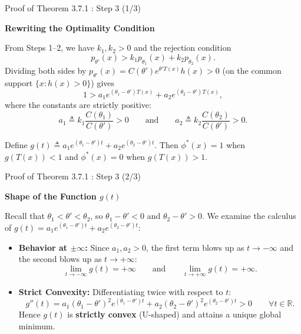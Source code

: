 \documentclass[10pt, aspectratio=169, xcolor=dvipsnames]{beamer}
\newcommand{\lead}[1]{{\color{UniBlue}\bfseries #1}}
\begin{document}
\begin{frame}{Proof of Theorem 3.7.1 : Step 3 (1/3)}
    
    \lead{Rewriting the Optimality Condition}\\
    \vspace{0.2cm}
    
    \color{Slate}
    From Steps 1--2, we have $k_1, k_2 > 0$ and the rejection condition
    \[
        p_{\theta'}(x) > k_1 p_{\theta_1}(x) + k_2 p_{\theta_2}(x).
    \]
    Dividing both sides by $p_{\theta'}(x) = C(\theta') e^{\theta' T(x)} h(x) > 0$ (on the common support $\{x : h(x) > 0\}$) gives
    \[
        1 > a_1 e^{(\theta_1 - \theta') T(x)} + a_2 e^{(\theta_2 - \theta') T(x)},
    \]
    where the constants are strictly positive:
    \[
        a_1 \triangleq k_1 \frac{C(\theta_1)}{C(\theta')} > 0
        \qquad \text{and} \qquad
        a_2 \triangleq k_2 \frac{C(\theta_2)}{C(\theta')} > 0.
    \]
    
    \vspace{0.15cm}
    Define $g(t) \triangleq a_1 e^{(\theta_1 - \theta') t} + a_2 e^{(\theta_2 - \theta') t}$. Then $\phi^*(x) = 1$ when $g(T(x)) < 1$ and $\phi^*(x) = 0$ when $g(T(x)) > 1$.
\end{frame}

\begin{frame}{Proof of Theorem 3.7.1 : Step 3 (2/3)}
    
    \lead{Shape of the Function $g(t)$}\\
    \vspace{0.2cm}
    
    \color{Slate}
    Recall that $\theta_1 < \theta' < \theta_2$, so $\theta_1 - \theta' < 0$ and $\theta_2 - \theta' > 0$. We examine the calculus of $g(t) = a_1 e^{(\theta_1 - \theta') t} + a_2 e^{(\theta_2 - \theta') t}$:
    
    \vspace{0.15cm}
    \begin{itemize}
        \setlength\itemsep{8pt}
        \item[\textcolor{Teal}{\textbullet}] \textbf{Behavior at $\pm\infty$:} Since $a_1, a_2 > 0$, the first term blows up as $t \to -\infty$ and the second blows up as $t \to +\infty$:
        \[
            \lim_{t \to -\infty} g(t) = +\infty
            \qquad \text{and} \qquad
            \lim_{t \to +\infty} g(t) = +\infty.
        \]
        
        \item[\textcolor{Teal}{\textbullet}] \textbf{Strict Convexity:} Differentiating twice with respect to $t$:
        \[
            g''(t) = a_1 (\theta_1 - \theta')^2 e^{(\theta_1 - \theta') t} + a_2 (\theta_2 - \theta')^2 e^{(\theta_2 - \theta') t} > 0 \qquad \forall t \in \mathbb{R}.
        \]
        Hence $g(t)$ is \textbf{strictly convex} (U-shaped) and attains a unique global minimum.
    \end{itemize}
\end{frame}
\end{document}
